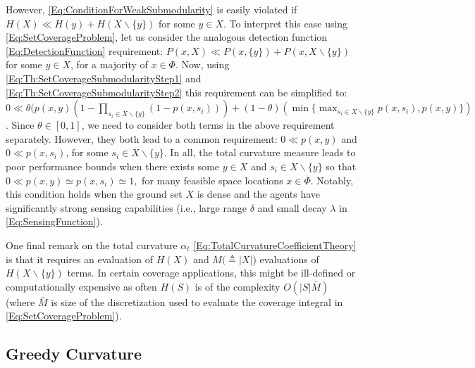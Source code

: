 \documentclass[letterpaper, 10 pt, conference]{ieeeconf}
\begin{document}
However, \eqref{Eq:ConditionForWeakSubmodularity} is easily violated if 
$H(X) \ll H(y) + H(X\backslash \{y\})$ for some $y\in X$.
To interpret this case using \eqref{Eq:SetCoverageProblem}, let us consider the analogous detection function \eqref{Eq:DetectionFunction} requirement: 
$P(x,X) \ll P(x,\{y\}) + P(x,X\backslash \{y\})$ for some $y\in X$,
for a majority of $x\in\Phi$. Now, using \eqref{Eq:Th:SetCoverageSubmodularityStep1} and \eqref{Eq:Th:SetCoverageSubmodularityStep2} this requirement can be simplified to:
$
0\ll \theta(p(x,y)(1-\prod_{s_i\in X\backslash \{y\}}(1-p(x,s_i)))
+(1-\theta)(\min\{\max_{s_i\in X\backslash \{y\}}p(x,s_i),p(x,y)\})$.  
Since $\theta \in [0,1]$, we need to consider both terms in the above requirement separately. However, they both lead to a common requirement:
$0 \ll p(x,y)$ and $0 \ll p(x,s_i)$, for some $s_i \in X\backslash \{y\}.$
In all, the total curvature measure leads to poor performance bounds when there exists some $y\in X$ and $s_i\in X\backslash \{y\}$ so that 
$0\ll p(x,y) \simeq p(x,s_i) \simeq 1,$
for many feasible space locations $x\in \Phi$. Notably, this condition holds when the ground set $X$ is dense and the agents have significantly strong sensing capabilities (i.e., large range $\delta$ and small decay $\lambda$ in \eqref{Eq:SensingFunction}).

One final remark on the total curvature $\alpha_t$ \eqref{Eq:TotalCurvatureCoefficientTheory} is that it requires an evaluation of $H(X)$ and $M(\triangleq \vert X\vert$) evaluations of $H(X\backslash \{y\})$ terms. In certain coverage applications, this might be ill-defined \cite{Sun2020} or computationally expensive as often $H(S)$ is of the complexity $O(\vert S \vert \bar{M})$ (where $\bar{M}$ is size of the discretization used to evaluate the coverage integral in \eqref{Eq:SetCoverageProblem}).


\subsection{Greedy Curvature \cite{Conforti1984}}
\label{SubSec:GreedyCurvature}
\end{document}
